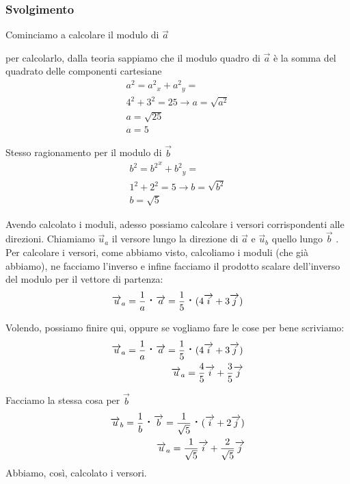 \subsubsection{Svolgimento}
Cominciamo a calcolare il modulo di $\overrightarrow{a}$

per calcolarlo, dalla teoria sappiamo che il modulo quadro di $ \overrightarrow{a} $ è la somma del quadrato delle componenti cartesiane
\begin{align*}
 a^{2} = {a^{2}}_{x} + {a^{2}}_{y} = \\
  4^{2} + 3^{2} = 25 \rightarrow a = \sqrt{a^{2}} \\
  a = \sqrt{25}\\
  a = 5
\end{align*}

Stesso ragionamento per il modulo di $ \overrightarrow{b} $
\begin{align*}
b^{2} = {b^{2}}^{x} + {b^{2}}_{y} = \\
1^{2} + 2^{2} = 5 \rightarrow b = \sqrt{b^{2}} \\
b = \sqrt{5}
\end{align*}

Avendo calcolato i moduli, adesso possiamo calcolare i versori corrispondenti alle direzioni. Chiamiamo $ \overrightarrow{u}_{a} $ il versore lungo la direzione di $ \overrightarrow{a} $ e $ \overrightarrow{u}_{b} $ quello lungo $ \overrightarrow{b} $ .
Per calcolare i versori, come abbiamo visto, calcoliamo i moduli (che già abbiamo), ne facciamo l'inverso e infine facciamo il prodotto scalare dell'inverso del modulo per il vettore di partenza:
\begin{align*}
\overrightarrow{u}_{a} = \frac{1}{a} \prodscal \overrightarrow{a} = \frac{1}{5} \prodscal (4\overrightarrow{i} + 3\overrightarrow{j}) 
\end{align*}

Volendo, possiamo finire qui, oppure se vogliamo fare le cose per bene scriviamo:
\begin{align*}
\overrightarrow{u}_{a} = \frac{1}{a} \prodscal \overrightarrow{a} = \frac{1}{5} \prodscal (4\overrightarrow{i} + 3\overrightarrow{j}) \\
\overrightarrow{u}_{a} = \frac{4}{5} \overrightarrow{i} + \frac{3}{5} \overrightarrow{j}
\end{align*}

Facciamo la stessa cosa per $ \overrightarrow{b} $
\begin{align*}
\overrightarrow{u}_{b} = \frac{1}{b} \prodscal \overrightarrow{b} = \frac{1}{\sqrt{5}} \prodscal (\overrightarrow{i} + 2\overrightarrow{j}) \\
\overrightarrow{u}_{a} = \frac{1}{\sqrt{5}} \overrightarrow{i} + \frac{2}{\sqrt{5}} \overrightarrow{j}
\end{align*}
Abbiamo, così, calcolato i versori.

